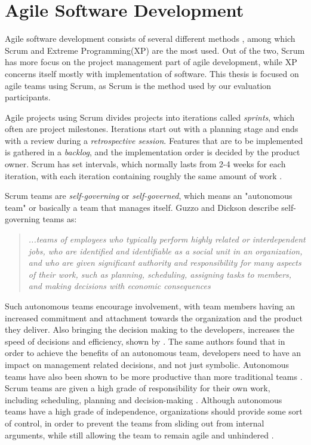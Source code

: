 \section{Agile Software Development}
Agile software development consists of several different methods \citep{abrahamsson2002agile}, among which Scrum \citep{schwaber2002agile} and Extreme Programming(XP) \citep{beck2004extreme} are the most used. Out of the two, Scrum has more focus on the project management part of agile development, while XP concerns itself mostly with implementation of software. This thesis is focused on agile teams using Scrum, as Scrum is the method used by our evaluation participants. 

Agile projects using Scrum divides projects into iterations called \emph{sprints}, which often are project milestones. Iterations start out with a planning stage and ends with a review during a \emph{retrospective session}. 
Features that are to be implemented is gathered in a \emph{backlog}, and the implementation order is decided by the product owner. Scrum has set intervals, which normally lasts from 2-4 weeks for each iteration, with each iteration containing roughly the same amount of work \citep{scrumguide}.

Scrum teams are \emph{self-governing} or \emph{self-governed}, which means an "autonomous team" or basically a team that manages itself. Guzzo and Dickson describe self-governing teams as:
\begin{quote}
\emph {...teams of employees who typically perform highly related or interdependent jobs,
who are identified and identifiable as a social unit in an organization, and who
are given significant authority and responsibility for many aspects of their work,
such as planning, scheduling, assigning tasks to members, and making decisions
with economic consequences}
\end{quote}
Such autonomous teams encourage involvement, with team members having an increased commitment and attachment towards the organization and the product they deliver. Also bringing the decision making to the developers, increases the speed of decisions and efficiency, shown by \citep{tata2004team}. The same authors found that in order to achieve the benefits of an autonomous team, developers need to have an impact on management related decisions, and not just symbolic. Autonomous teams have also been shown to be more productive than more traditional teams \citep{kirkman1999beyond}. 
Scrum teams are given a high grade of responsibility for their own work, including scheduling, planning and decision-making \citep{schwaber2002agile}. Although autonomous teams have a high grade of independence, organizations should provide some sort of control, in order to prevent the teams from sliding out from internal arguments, while still allowing the team to remain agile and unhindered \citep{takeuchi1986new}.

